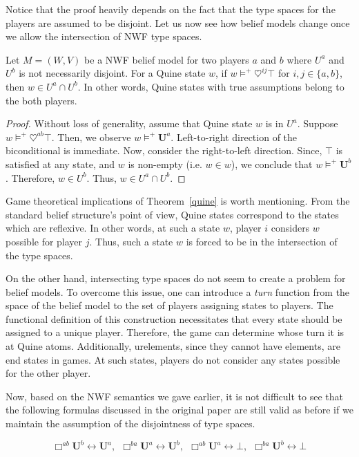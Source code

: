 \documentclass{article}
\begin{document}
Notice that the proof heavily depends on the fact that the type spaces for the players are assumed to be disjoint. Let us now see how belief models change once we allow the intersection of NWF type spaces.

\begin{thm}{\label{quine}}
Let $M = (W, V)$ be a NWF belief model for two players $a$ and $b$ where $U^a$ and $U^b$ is not necessarily disjoint. For a Quine state $w$, if $w \models^+ \heartsuit^{ij} \top$ for $i, j \in \{ a, b\}$, then $w \in U^a \cap U^b$. In other words, Quine states with true assumptions belong to the both players.
\end{thm}

\begin{proof}
Without loss of generality, assume that Quine state $w$ is in $U^a$. Suppose $w \models^+ \heartsuit^{ab} \top$. Then, we observe $w \models^+ \mathbf{U}^a$. Left-to-right direction of the biconditional is immediate. Now, consider the right-to-left direction. Since, $\top$ is satisfied at any state, and $w$ is non-empty (i.e. $w \in w$), we conclude that $w \models^+ \mathbf{U}^b$. Therefore, $w \in U^b$. Thus, $w \in U^a \cap U^b$.
\end{proof}

Game theoretical implications of Theorem~\ref{quine} is worth mentioning. From the standard belief structure's point of view, Quine states correspond to the states which are reflexive. In other words, at such a state $w$, player $i$ considers $w$ possible for player $j$. Thus, such a state $w$ is forced to be in the intersection of the type spaces.

On the other hand, intersecting type spaces do not seem to create a problem for belief models. To overcome this issue, one can introduce a \emph{turn} function from the space of the belief model to the set of players assigning states to players. The functional definition of this construction necessitates that every state should be assigned to a unique player. Therefore, the game can determine whose turn it is at Quine atoms. Additionally, urelements, since they cannot have elements, are end states in games. At such states, players do not consider any states possible for the other player.

Now, based on the NWF semantics we gave earlier, it is not difficult to see that the following formulas discussed in the original paper are still valid as before if we maintain the assumption of the disjointness of type spaces.

$$\Box^{ab} \mathbf{U}^b \leftrightarrow \mathbf{U}^a,~~ \Box^{ba} \mathbf{U}^a \leftrightarrow \mathbf{U}^b,~~ \Box^{ab} \mathbf{U}^a \leftrightarrow \bot,~~ \Box^{ba} \mathbf{U}^b \leftrightarrow \bot$$
\end{document}
